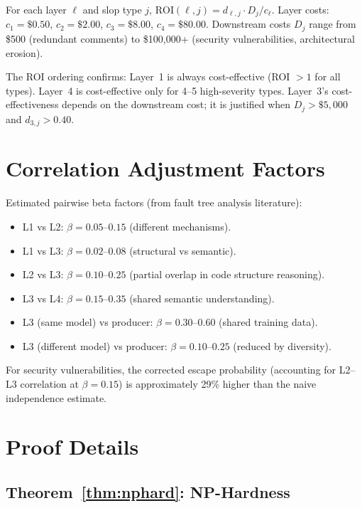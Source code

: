 \documentclass[11pt, a4paper]{article}
\theoremstyle{definition}
\theoremstyle{remark}
\newcommand{\ROI}{\mathrm{ROI}}
\begin{document}
For each layer $\ell$ and slop type $j$, $\ROI(\ell, j) = d_{\ell,j} \cdot D_j / c_\ell$. Layer costs: $c_1 = \$0.50$, $c_2 = \$2.00$, $c_3 = \$8.00$, $c_4 = \$80.00$. Downstream costs $D_j$ range from \$500 (redundant comments) to \$100,000+ (security vulnerabilities, architectural erosion).

The ROI ordering confirms: Layer~1 is always cost-effective (ROI $> 1$ for all types). Layer~4 is cost-effective only for 4--5 high-severity types. Layer~3's cost-effectiveness depends on the downstream cost; it is justified when $D_j > \$5,000$ and $d_{3,j} > 0.40$.

\section{Correlation Adjustment Factors}
\label{app:correlation}

Estimated pairwise beta factors (from fault tree analysis literature):

\begin{itemize}[leftmargin=2em]
\item L1 vs L2: $\beta = 0.05$--$0.15$ (different mechanisms).
\item L1 vs L3: $\beta = 0.02$--$0.08$ (structural vs semantic).
\item L2 vs L3: $\beta = 0.10$--$0.25$ (partial overlap in code structure reasoning).
\item L3 vs L4: $\beta = 0.15$--$0.35$ (shared semantic understanding).
\item L3 (same model) vs producer: $\beta = 0.30$--$0.60$ (shared training data).
\item L3 (different model) vs producer: $\beta = 0.10$--$0.25$ (reduced by diversity).
\end{itemize}

For security vulnerabilities, the corrected escape probability (accounting for L2--L3 correlation at $\beta = 0.15$) is approximately 29\% higher than the naive independence estimate.

\section{Proof Details}
\label{app:proofs}

\subsection{Theorem~\ref{thm:nphard}: NP-Hardness}
\end{document}
